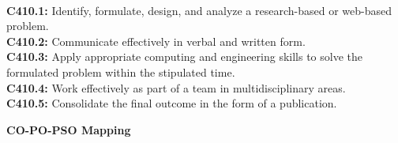 \newcommand{\normal}{\fontsize{12pt}{16pt}\selectfont}
\newcommand{\size}{\fontsize{14pt}{18pt}\selectfont}
\newcommand{\bigsize}{\fontsize{16pt}{20pt}\selectfont}
\newcommand{\bigbigsize}{\fontsize{20pt}{24pt}\selectfont}
\begin{flushleft}
\textbf{\size{Course Outcomes (COs)}}
\end{flushleft}
\\
\textbf{C410.1:} Identify, formulate, design, and analyze a research-based or web-based problem.\\
\textbf{C410.2:} Communicate effectively in verbal and written form.\\
\textbf{C410.3:} Apply appropriate computing and engineering skills to solve the formulated problem within the stipulated time.\\
\textbf{C410.4:} Work effectively as part of a team in multidisciplinary areas.\\
\textbf{C410.5:} Consolidate the final outcome in the form of a publication.\ \\

\begin{flushleft}
\size\textbf{CO-PO-PSO Mapping}
\end{flushleft}
\\
\renewcommand{\arraystretch}{2}

